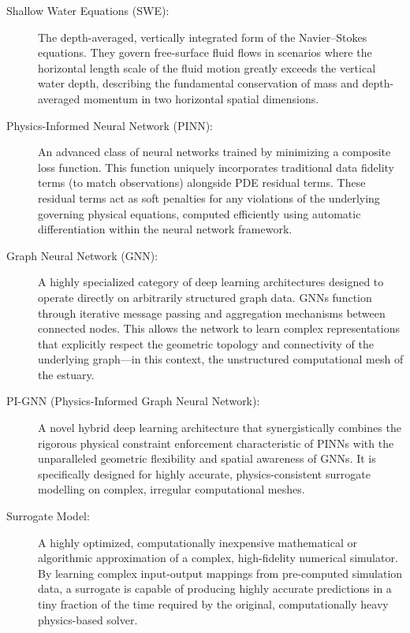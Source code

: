 \begin{description}
    \item[Shallow Water Equations (SWE):] The depth-averaged, vertically
    integrated form of the Navier--Stokes equations. They govern free-surface
    fluid flows in scenarios where the horizontal length scale of the fluid motion greatly exceeds the vertical water
    depth, describing the fundamental conservation of mass and depth-averaged
    momentum in two horizontal spatial dimensions.

    \item[Physics-Informed Neural Network (PINN):] An advanced class of neural networks trained
    by minimizing a composite loss function. This function uniquely incorporates traditional data
    fidelity terms (to match observations) alongside PDE
    residual terms. These residual terms act as soft penalties for any violations of the underlying governing physical equations,
    computed efficiently using automatic differentiation within the neural network framework.

    \item[Graph Neural Network (GNN):] A highly specialized category of deep learning architectures designed to
    operate directly on arbitrarily structured graph data. GNNs function through iterative
    message passing and aggregation mechanisms between connected nodes. This allows the network to
    learn complex representations that explicitly respect the geometric topology and connectivity of the underlying
    graph---in this context, the unstructured computational mesh of the estuary.

    \item[PI-GNN (Physics-Informed Graph Neural Network):] A novel hybrid deep learning
    architecture that synergistically combines the rigorous physical constraint enforcement characteristic of
    PINNs with the unparalleled geometric flexibility and spatial awareness of GNNs. It is specifically designed for highly accurate,
    physics-consistent surrogate modelling on complex, irregular computational
    meshes.

    \item[Surrogate Model:] A highly optimized, computationally inexpensive mathematical or algorithmic approximation
    of a complex, high-fidelity numerical simulator. By learning complex input-output mappings from pre-computed simulation data, a surrogate is
    capable of producing highly accurate predictions in a tiny fraction of the time required
    by the original, computationally heavy physics-based solver.


\end{description}
